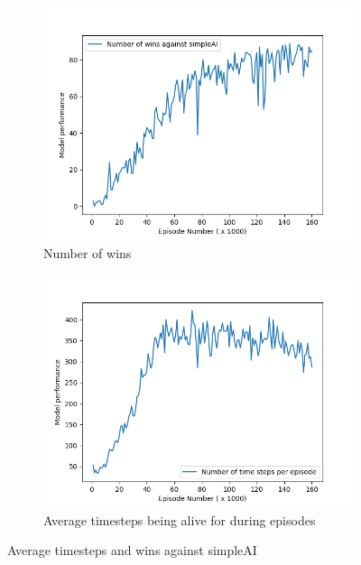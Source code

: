 \begin{figure}[ht!]
    \centering
    \begin{subfigure}{0.49\textwidth}
        \centering
        \includegraphics[scale=0.4]{figures/dqn_results_wins.png}
        \caption{Number of wins}
        \label{fig:Number of wins}
    \end{subfigure}
    \begin{subfigure}{0.49\textwidth}
        \centering
        \includegraphics[scale=0.4]{figures/ttd_per_episode.png}
        \caption{ Average timesteps being alive for during episodes}
        \label{fig: Average timesteps being alive for during episodes}
	\end{subfigure}    
    \caption{Average timesteps and wins against simpleAI}
\end{figure}

